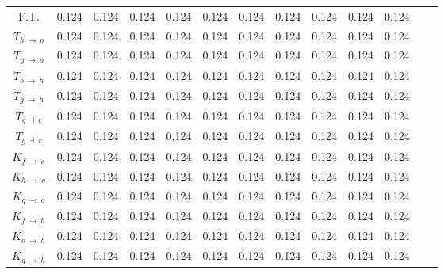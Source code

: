 \begin{ThreePartTable}
\begin{longtable}{c l *{10}{c} c}
        F.T.\tnote{c}  & 0.124 &  0.124 &  0.124 &  0.124 &  0.124 &  0.124 &  0.124 &  0.124 &  0.124 &  0.124 \\
        
        $T_{h \: \rightarrow \: o}$\tnote{d} & 0.124 &  0.124 &  0.124 &  0.124 &  0.124 &  0.124 &  0.124 &  0.124 &  0.124 &  0.124 \\
        
        $T_{g \: \rightarrow \: o}$ & 0.124 &  0.124 &  0.124 &  0.124 &  0.124 &  0.124 &  0.124 &  0.124 &  0.124 &  0.124 \\
        
        $T_{o \: \rightarrow \: h}$ & 0.124 &  0.124 &  0.124 &  0.124 &  0.124 &  0.124 &  0.124 &  0.124 &  0.124 &  0.124 \\
        
        $T_{g \: \rightarrow \: h}$ & 0.124 &  0.124 &  0.124 &  0.124 &  0.124 &  0.124 &  0.124 &  0.124 &  0.124 &  0.124 \\
        
        $T_{g \: \dashv \: c}$ & 0.124 &  0.124 &  0.124 &  0.124 &  0.124 &  0.124 &  0.124 &  0.124 &  0.124 &  0.124 \\
        
        $T_{g \: \dashv \: r}$ & 0.124 &  0.124 &  0.124 &  0.124 &  0.124 &  0.124 &  0.124 &  0.124 &  0.124 &  0.124 \\
        
        $K_{f \: \rightarrow \: o}$\tnote{e} & 0.124 &  0.124 &  0.124 &  0.124 &  0.124 &  0.124 &  0.124 &  0.124 &  0.124 &  0.124 \\
        
        $K_{h \: \rightarrow \: o}$ & 0.124 &  0.124 &  0.124 &  0.124 &  0.124 &  0.124 &  0.124 &  0.124 &  0.124 &  0.124 \\
        
        $K_{g \: \rightarrow \: o}$ & 0.124 &  0.124 &  0.124 &  0.124 &  0.124 &  0.124 &  0.124 &  0.124 &  0.124 &  0.124 \\
        
        $K_{f \: \rightarrow \: h}$ & 0.124 &  0.124 &  0.124 &  0.124 &  0.124 &  0.124 &  0.124 &  0.124 &  0.124 &  0.124 \\
        
        $K_{o \: \rightarrow \: h}$ & 0.124 &  0.124 &  0.124 &  0.124 &  0.124 &  0.124 &  0.124 &  0.124 &  0.124 &  0.124 \\
        
        $K_{g \: \rightarrow \: h}$ & 0.124 &  0.124 &  0.124 &  0.124 &  0.124 &  0.124 &  0.124 &  0.124 &  0.124 &  0.124 \\
        

\end{longtable}
\end{ThreePartTable}
